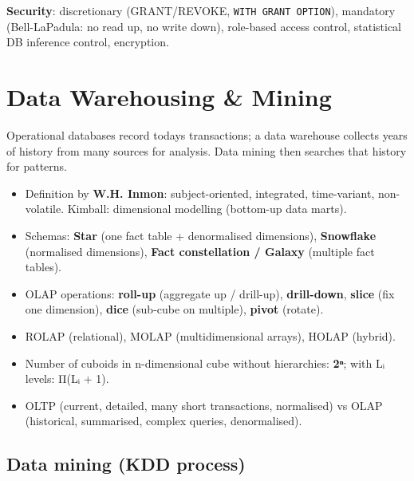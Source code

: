 \endgroup

\textbf{Security}: discretionary (GRANT/REVOKE, \texttt{WITH\ GRANT\ OPTION}), mandatory (Bell-LaPadula: no read up, no write down), role-based access control, statistical DB inference control, encryption.

\needspace{125pt}

\hypertarget{p2-04--10-data-warehousing--mining}{%
\section{Data Warehousing \& Mining}\label{p2-04--10-data-warehousing--mining}}

Operational databases record today\textquotesingle s transactions; a data warehouse collects years of history from many
sources for analysis. Data mining then searches that history for patterns.



\begin{itemize}
\tightlist
\item
  Definition by \textbf{W.H. Inmon}: subject-oriented, integrated, time-variant, non-volatile. Kimball: dimensional modelling (bottom-up data marts).
\item
  Schemas: \textbf{Star} (one fact table + denormalised dimensions), \textbf{Snowflake} (normalised dimensions), \textbf{Fact constellation / Galaxy} (multiple fact tables).
\item
  OLAP operations: \textbf{roll-up} (aggregate up / drill-up), \textbf{drill-down}, \textbf{slice} (fix one dimension), \textbf{dice} (sub-cube on multiple), \textbf{pivot} (rotate).
\item
  ROLAP (relational), MOLAP (multidimensional arrays), HOLAP (hybrid).
\item
  Number of cuboids in n-dimensional cube without hierarchies: \textbf{2ⁿ}; with Lᵢ levels: Π(Lᵢ + 1).
\item
  OLTP (current, detailed, many short transactions, normalised) vs OLAP (historical, summarised, complex queries, denormalised).
\end{itemize}

\needspace{155pt}

\hypertarget{p2-04--data-mining-kdd-process}{%
\subsection{Data mining (KDD process)}\label{p2-04--data-mining-kdd-process}}

